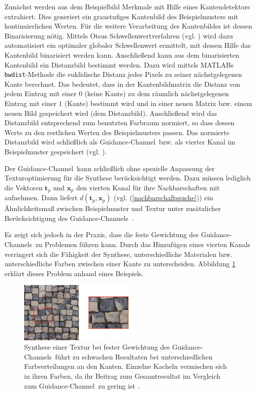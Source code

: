Zunächst werden aus dem Beispielbild Merkmale mit Hilfe eines Kantendetektors extrahiert.
Dies generiert ein graustufiges Kantenbild des Beispielmusters mit kontinuierlichen Werten.
Für die weitere Verarbeitung des Kantenbildes ist dessen Binarisierung nötig.
Mittels Otsus Schwellenwertverfahren (vgl. \cite{Otsu}) wird dazu automatisiert ein optimaler globaler Schwellenwert ermittelt, mit dessen Hilfe das Kantenbild binarisiert werden kann.
Anschließend kann aus dem binarisierten Kantenbild ein Distanzbild bestimmt werden.
Dazu wird mittels MATLABs \texttt{bwdist}-Methode die euklidische Distanz jedes Pixels zu seiner nächstgelegenen Kante berechnet.
Das bedeutet, dass in der Kantenbildmatrix die Distanz von jedem Eintrag mit einer $0$ (keine Kante) zu dem räumlich nächstgelegenen Eintrag mit einer $1$ (Kante) bestimmt wird und in einer neuen Matrix bzw. einem neuen Bild gespeichert wird (dem Distanzbild).
Anschließend wird das Distanzbild entsprechend zum benutzten Farbraum normiert, so dass dessen Werte zu den restlichen Werten des Beispielmusters passen.
Das normierte Distanzbild wird schließlich als \glqq Guidance-Channel\grqq \ bzw. als vierter Kanal im Beispielmuster gespeichert (vgl. \cite{SelfTuning}).

Der \glqq Guidance-Channel\grqq \ kann schließlich ohne spezielle Anpassung der Texturoptimierung  für die Synthese berücksichtigt werden.
Dazu müssen lediglich die Vektoren $\textbf{t}_p$ und $\textbf{x}_p$ den vierten Kanal für ihre Nachbarschaften mit aufnehmen.
Dann liefert $d(\textbf{t}_p, \textbf{x}_p)$ (vgl. (\ref{nachbarschaftssuche})) ein Ähnlichkeitsmaß zwischen Beispielmuster und Textur unter zusätzlicher Be\-rück\-sich\-ti\-gung des \glqq Guidance-Channels\grqq \ \cite{SelfTuning}.

Es zeigt sich jedoch in der Praxis, dass die feste Gewichtung des \glqq Guidance-Channels\grqq \ zu Problemen führen kann.
Durch das Hinzufügen eines vierten Kanals verringert sich die Fähigkeit der Synthese, unterschiedliche Materialen bzw. unterschiedliche Farben zwischen einer Kante zu unterscheiden.
Abbildung \ref{guidance-channel-weight} erklärt dieses Problem anhand eines Beispiels.

\begin{figure}
	\centering
	\includegraphics[width=0.5\textwidth]{images/guidance-channel-weight}
	\caption{
		Synthese einer Textur bei fester Gewichtung des \glqq Guidance-Channels\grqq \ führt zu schwachen Resultaten bei unterschiedlichen Farbverteilungen an den Kanten.
		Einzelne Kacheln vermischen sich in ihren Farben, da ihr Beitrag zum Gesamtresultat im Vergleich zum \glqq Guidance-Channel\grqq \ zu gering ist \cite{SelfTuning}.
	}
	\label{guidance-channel-weight}
\end{figure}

